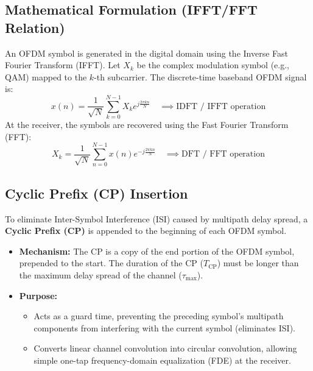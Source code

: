 \documentclass[12pt,a4paper]{article}
\begin{document}
\subsection{Mathematical Formulation (IFFT/FFT Relation)}
An OFDM symbol is generated in the digital domain using the Inverse Fast Fourier Transform (IFFT). Let $X_k$ be the complex modulation symbol (e.g., QAM) mapped to the $k$-th subcarrier. The discrete-time baseband OFDM signal is:
\begin{equation}
  x(n) = \frac{1}{\sqrt{N}} \sum_{k=0}^{N-1} X_k e^{j \frac{2\pi k n}{N}} \quad \implies \text{IDFT / IFFT operation}
\end{equation}
At the receiver, the symbols are recovered using the Fast Fourier Transform (FFT):
\begin{equation}
  X_k = \frac{1}{\sqrt{N}} \sum_{n=0}^{N-1} x(n) e^{-j \frac{2\pi k n}{N}} \quad \implies \text{DFT / FFT operation}
\end{equation}

\subsection{Cyclic Prefix (CP) Insertion}
To eliminate Inter-Symbol Interference (ISI) caused by multipath delay spread, a \textbf{Cyclic Prefix (CP)} is appended to the beginning of each OFDM symbol.
\begin{itemize}[leftmargin=*, itemsep=3.0pt]
  \item \textbf{Mechanism:} The CP is a copy of the end portion of the OFDM symbol, prepended to the start. The duration of the CP ($T_{\text{CP}}$) must be longer than the maximum delay spread of the channel ($\tau_{\text{max}}$).
  \item \textbf{Purpose:} 
    \begin{itemize}[leftmargin=*, itemsep=2pt, topsep=2pt]
      \item Acts as a guard time, preventing the preceding symbol's multipath components from interfering with the current symbol (eliminates ISI).
      \item Converts linear channel convolution into circular convolution, allowing simple one-tap frequency-domain equalization (FDE) at the receiver.
    \end{itemize}
\end{itemize}
\end{document}
